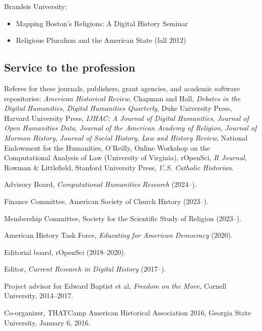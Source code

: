 \documentclass[11pt]{article}
\providecommand{\tightlist}{%
  \setlength{\itemsep}{0pt}\setlength{\parskip}{0pt}}
\begin{document}
\vspace{-0.1in}

Brandeis University:

\vspace{-0.15in}

\begin{itemize}
    \tightlist
  \item
    Mapping Boston's Religions: A Digital History Seminar 
  \item
    Religious Pluralism and the American State (fall 2012)
\end{itemize}

\subsection{Service to the profession}\label{Service to the profession}

Referee for these journals, publishers, grant agencies, and academic software 
repositories: \emph{American Historical Review}, Chapman and Hall, \emph{Debates 
in the Digital Humanities}, \emph{Digital Humanities Quarterly}, Duke University 
Press, Harvard University Press, \emph{IJHAC: A Journal of Digital Humanities}, 
\emph{Journal of Open Humanities Data}, \emph{Journal of the American Academy of 
Religion}, \emph{Journal of Mormon History}, \emph{Journal of Social History}, 
\emph{Law and History Review}, National Endowment for the Humanities, O'Reilly, 
Online Workshop on the Computational Analysis of Law (University of Virginia),
rOpenSci, \emph{R Journal}, Rowman \& Littlefield, Stanford University Press,
\emph{U.S. Catholic Historian}.

Advisory Board, \emph{Computational Humanities Research} (2024--).

Finance Committee, American Society of Church History (2023--).

Membership Committee, Society for the Scientific Study of Religion (2023--).

American History Task Force, \emph{Educating for American Democracy} (2020).

Editorial board, rOpenSci (2018--2020).

Editor, \emph{Current Research in Digital History} (2017--).

Project advisor for Edward Baptist et al, \emph{Freedom on the Move}, Cornell University, 2014--2017.

Co-organizer, THATCamp American Historical Association 2016, Georgia State University, January 6, 2016.
\end{document}
